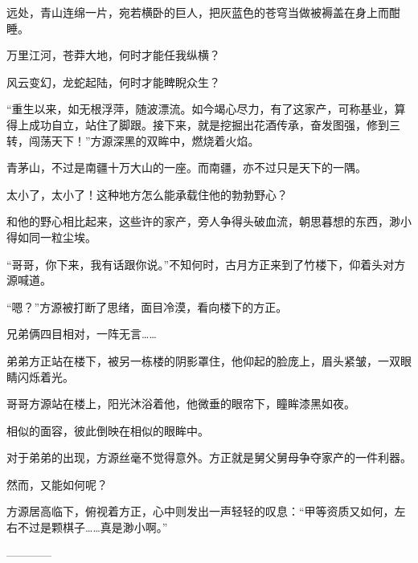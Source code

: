 \begin{this_body}
远处，青山连绵一片，宛若横卧的巨人，把灰蓝色的苍穹当做被褥盖在身上而酣睡。

万里江河，苍莽大地，何时才能任我纵横？

风云变幻，龙蛇起陆，何时才能睥睨众生？

“重生以来，如无根浮萍，随波漂流。如今竭心尽力，有了这家产，可称基业，算得上成功自立，站住了脚跟。接下来，就是挖掘出花酒传承，奋发图强，修到三转，闯荡天下！”方源深黑的双眸中，燃烧着火焰。

青茅山，不过是南疆十万大山的一座。而南疆，亦不过只是天下的一隅。

太小了，太小了！这种地方怎么能承载住他的勃勃野心？

和他的野心相比起来，这些许的家产，旁人争得头破血流，朝思暮想的东西，渺小得如同一粒尘埃。

“哥哥，你下来，我有话跟你说。”不知何时，古月方正来到了竹楼下，仰着头对方源喊道。

“嗯？”方源被打断了思绪，面目冷漠，看向楼下的方正。

兄弟俩四目相对，一阵无言……

弟弟方正站在楼下，被另一栋楼的阴影罩住，他仰起的脸庞上，眉头紧皱，一双眼睛闪烁着光。

哥哥方源站在楼上，阳光沐浴着他，他微垂的眼帘下，瞳眸漆黑如夜。

相似的面容，彼此倒映在相似的眼眸中。

对于弟弟的出现，方源丝毫不觉得意外。方正就是舅父舅母争夺家产的一件利器。

然而，又能如何呢？

方源居高临下，俯视着方正，心中则发出一声轻轻的叹息：“甲等资质又如何，左右不过是颗棋子……真是渺小啊。”

------------

\end{this_body}

